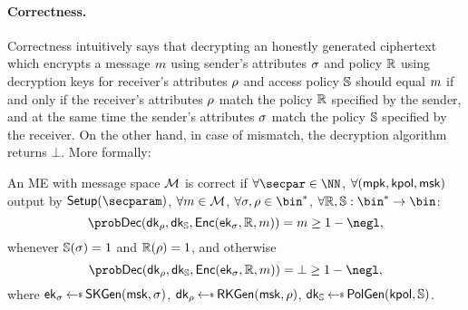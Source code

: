 \paragraph*{Correctness.} Correctness intuitively says that decrypting an honestly generated ciphertext which encrypts a message $m$ using sender's attributes $\sigma$ and policy $\mathbb{R}$ using decryption keys for receiver's attributes $\rho$ and access policy $\mathbb{S}$ should equal $m$ if and only if the receiver's attributes $\rho$ match the policy $\mathbb{R}$ specified by the sender, and at the same time the sender's attributes $\sigma$ match the policy $\mathbb{S}$ specified by the receiver. On the other hand, in case of mismatch, the decryption algorithm returns $\bot$.
More formally:
\begin{definition}[Correctness of ME]\label{def:DNISHcorrectness}
    An ME with message space $\mathcal{M}$ is correct if $\forall\secpar\in\NN$, $\forall (\mathsf{mpk}, \mathsf{kpol}, \mathsf{msk})$ output by $\setup(\secparam)$,
    $\forall m \in \mathcal{M}$, $\forall \sattr,\rattr \in \bin^*$,
    $\forall \raccess,\saccess:\bin^*\rightarrow\bin$:
    \[
        \Prob{\dec(\dk_{\rattr}, \dk_{\saccess}, \enc(\ek_{\sattr}, \raccess, \msg)) = \msg} \geq 1 - \negl,
    \]
    whenever $\mathbb{S}(\sigma)=1$ and $\mathbb{R}(\rho)=1$, and otherwise
    \[
        \Prob{\dec(\dk_{\rattr}, \dk_{\saccess}, \enc(\ek_{\sattr}, \raccess, \msg)) = \bot} \geq 1 - \negl,
    \]
    where $\ek_{\sattr} \getsr \skgen(\msk, \sattr)$, $\dk_{\rattr} \getsr \rkgen(\allowbreak\msk, \rattr)$, $\dk_{\saccess} \getsr \polgen(\kpol, \saccess)$.
\end{definition}

